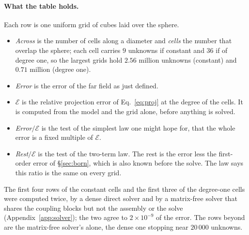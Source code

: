 \documentclass[11pt,a4paper]{article}
\newcommand{\cE}{\mathcal{E}}
\begin{document}
\paragraph{What the table holds.} Each row is one uniform grid of cubes laid over the sphere.
\begin{itemize}
\item \emph{Across} is the number of cells along a diameter and \emph{cells} the number that overlap the
sphere; each cell carries $9$ unknowns if constant and $36$ if of degree one, so the largest grids hold
$2.56$ million unknowns (constant) and $0.71$ million (degree one).
\item \emph{Error} is the error of the far field as just defined.
\item $\cE$ is the relative projection error of Eq.~\eqref{eq:proj} at the degree of the cells. It is
computed from the model and the grid alone, before anything is solved.
\item \emph{Error}$/\cE$ is the test of the simplest law one might hope for, that the whole error is a
fixed multiple of $\cE$.
\item \emph{Rest}$/\cE$ is the test of the two-term law. The rest is the error less the first-order error
of \S\ref{sec:born}, which is also known before the solve. The law says this ratio is the same on every
grid.
\end{itemize}
The first four rows of the constant cells and the first three of the degree-one cells were computed
twice, by a dense direct solver and by a matrix-free solver that shares the coupling blocks but not the
assembly or the solve (Appendix~\ref{app:solver}); the two agree to $2\times10^{-9}$ of the error. The
rows beyond are the matrix-free solver's alone, the dense one stopping near $20\,000$ unknowns.
\end{document}
